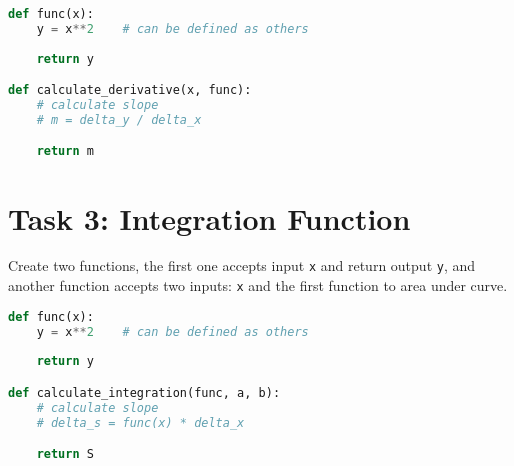\documentclass[11pt]{article}
\begin{document}
\begin{lstlisting}[language=Python]
def func(x):
    y = x**2    # can be defined as others
    
    return y

def calculate_derivative(x, func):
    # calculate slope
    # m = delta_y / delta_x

    return m
\end{lstlisting}

\begin{tcolorbox}[colback=black!10!white, colframe=black!75!white, title=\textbf{Answer}]
    \vspace{3cm}
\end{tcolorbox} 

\section*{Task 3: Integration Function}
Create two functions, the first one accepts input \texttt{x} and return output \texttt{y}, and another function accepts two inputs: \texttt{x} and the first function to area under curve.

\begin{lstlisting}[language=Python]
def func(x):
    y = x**2    # can be defined as others
    
    return y

def calculate_integration(func, a, b):
    # calculate slope
    # delta_s = func(x) * delta_x

    return S
\end{lstlisting}

\begin{tcolorbox}[colback=black!10!white, colframe=black!75!white, title=\textbf{Answer}]
    \vspace{3cm}
\end{tcolorbox} 
\end{document}
